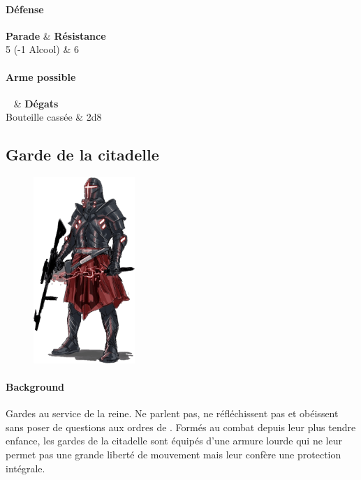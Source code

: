 \paragraph{Défense}
\begin{itemtable}[ c c ]
    \textbf{Parade}     & \textbf{Résistance} \\
    5 (-1 Alcool)       & 6
\end{itemtable}

\paragraph{Arme possible}
\begin{itemtable}[ X c c ]
    ~                & \textbf{Dégats} \\
    Bouteille cassée & 2d8
\end{itemtable}


\newpage

\subsection{Garde de la citadelle} \label{sec:citadel-guard}
\begin{figure}[h!]
    \centering
    \includegraphics[height=200pt]{_img/bestiary/citadel-guard.png}
\end{figure}
\paragraph{Background}
Gardes au service de la reine. Ne parlent pas, ne réfléchissent pas et obéissent sans poser de questions aux ordres de . Formés au combat depuis leur plus tendre enfance, les gardes de la citadelle sont équipés d’une armure lourde qui ne leur permet pas une grande liberté de mouvement mais leur confère une protection intégrale.

